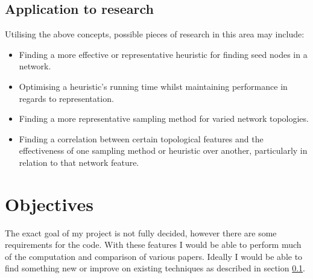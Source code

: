 \documentclass{article}
\begin{document}
\subsection{Application to research} \label{implementation}
Utilising the above concepts, possible pieces of research in this area may include:
\begin{itemize}
	\item Finding a more effective or representative heuristic for finding seed nodes in a network.
	\item Optimising a heuristic's running time whilst maintaining performance in regards to representation.
	\item Finding a more representative sampling method for varied network topologies.
	\item Finding a correlation between certain topological features and the effectiveness of one sampling method or heuristic over another, particularly in relation to that network feature.
\end{itemize}

\section{Objectives} \label{objectives}

The exact goal of my project is not fully decided, however there are some requirements for the code.
With these features I would be able to perform much of the computation and comparison of various papers.
Ideally I would be able to find something new or improve on existing techniques as described in section \ref{implementation}.
\end{document}
